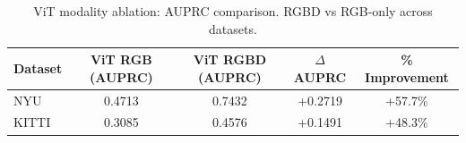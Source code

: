 \begin{table}[h]
  \centering
  \caption{ViT modality ablation: AUPRC comparison. RGBD vs RGB-only across datasets.}
  \label{tab:vit_modality_auprc}
  \begin{tabular}{lcccc}
    \toprule
    Dataset & ViT RGB (AUPRC) & ViT RGBD (AUPRC) & $\Delta$AUPRC & \% Improvement \\ 
    \midrule
    NYU & 0.4713 & 0.7432 & +0.2719 & +57.7\% \\
    KITTI & 0.3085 & 0.4576 & +0.1491 & +48.3\% \\
    \bottomrule
  \end{tabular}
\end{table}
